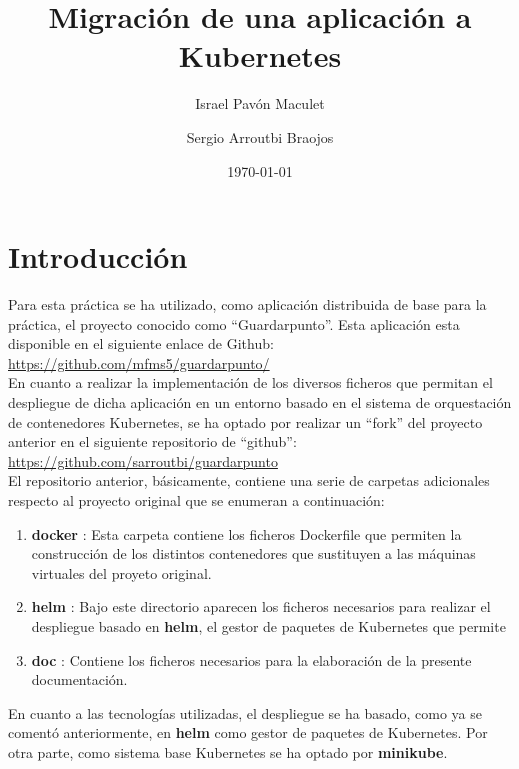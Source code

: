 \documentclass[12pt,spanish]{article}
\title{\textbf{Migración de una aplicación a Kubernetes}}
\author{Israel Pavón Maculet\\
  \and
  Sergio Arroutbi Braojos}
\date{\today}
\begin{document}
\maketitle
\hypersetup{linkcolor=black,urlcolor=blue}
\tableofcontents

\listoffigures

\pagebreak
\section{Introducción}

Para esta práctica se ha utilizado, como aplicación distribuida de base para la práctica, el proyecto conocido como ``Guardarpunto''. Esta aplicación esta disponible en el siguiente enlace de Github:\\

\url{https://github.com/mfms5/guardarpunto/}\\

En cuanto a realizar la implementación de los diversos ficheros que permitan el despliegue de dicha aplicación en un entorno basado en el sistema de orquestación de contenedores Kubernetes, se ha optado por realizar un ``fork'' del proyecto anterior en el siguiente repositorio de ``github'':\\

\url{https://github.com/sarroutbi/guardarpunto}\\

El repositorio anterior, básicamente, contiene una serie de carpetas adicionales respecto al proyecto original que se enumeran a continuación:

\begin{enumerate}
\item{\textbf{docker} :} Esta carpeta contiene los ficheros Dockerfile que permiten la construcción de los distintos contenedores que sustituyen a las máquinas virtuales del proyeto original.
\item{\textbf{helm} :} Bajo este directorio aparecen los ficheros necesarios para realizar el despliegue basado en \textbf{helm}, el gestor de paquetes de Kubernetes que permite
\item{\textbf{doc} :} Contiene los ficheros necesarios para la elaboración de la presente documentación.
\end{enumerate}

En cuanto a las tecnologías utilizadas, el despliegue se ha basado, como ya se comentó anteriormente, en \textbf{helm} como gestor de paquetes de Kubernetes. Por otra parte, como sistema base Kubernetes se ha optado por \textbf{minikube}.\\
\end{document}
